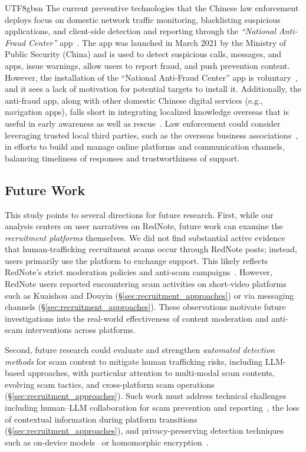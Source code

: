 \documentclass[sigconf,nonacm]{acmart}
\newcommand{\rev}[1]{#1}
\begin{document}
\begin{CJK}{UTF8}{gbsn}
The current preventive technologies that the Chinese law enforcement deploys focus on domestic network traffic monitoring, blacklisting suspicious applications, and client-side detection and reporting through the \textit{``National Anti-Fraud Center''} app~\cite{verdict2021antifraudapp}. The app was launched in March 2021 by the Ministry of Public Security (China) and is used to detect suspicious calls, messages, and apps, issue warnings, allow users to report fraud, and push prevention content. However, the installation of the ``National Anti-Fraud Center'' app is voluntary~\cite{sohu2023fraud}, and it sees a lack of motivation for potential targets to install it. Additionally, the anti-fraud app, along with other domestic Chinese digital services (e.g., navigation apps), falls short in integrating localized knowledge overseas that is useful in early awareness as well as rescue~\cite{de2017comprehensive}. Law enforcement could consider leveraging trusted local third parties, such as the overseas business associations~\cite{mazerolle2023partnership}, in efforts to build and manage online platforms and communication channels, balancing timeliness of responses and trustworthiness of support.

\subsection{Future Work}

\rev{This study points to several directions for future research. First, while our analysis centers on user narratives on RedNote, future work can examine the \textit{recruitment platforms} themselves. We did not find substantial active evidence that human-trafficking recruitment scams occur through RedNote posts; instead, users primarily use the platform to exchange support. This likely reflects RedNote's strict moderation policies and anti-scam campaigns~\cite{chen2025impact}. However, RedNote users reported encountering scam activities on short-video platforms such as Kuaishou and Douyin (\S\ref{sec:recruitment_approaches}) or via messaging channels (\S\ref{sec:recruitment_approaches}). These observations motivate future investigations into the real-world effectiveness of content moderation and anti-scam interventions across platforms.} 

\rev{Second, future research could evaluate and strengthen \textit{automated detection methods} for scam content to mitigate human trafficking risks, including LLM-based approaches, with particular attention to multi-modal scam contents, evolving scam tactics, and cross-platform scam operations (\S\ref{sec:recruitment_approaches}). Such work must address technical challenges including human--LLM collaboration for scam prevention and reporting~\cite{hossain2025aiintheloop}, the loss of contextual information during platform transitions (\S\ref{sec:recruitment_approaches}), and privacy-preserving detection techniques such as on-device models~\cite{wang2025empowering} or homomorphic encryption~\cite{jin2023fedml}.} 


\end{CJK}
\end{document}
